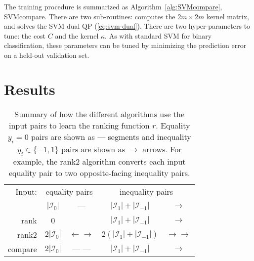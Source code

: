 \documentclass[twoside,11pt]{article}
\begin{document}
The training procedure is summarized as
Algorithm~\ref{alg:SVMcompare}, SVMcompare.
There are two sub-routines:  computes
the $2m\times 2m$ kernel matrix, and  solves the SVM
dual QP (\ref{eq:svm-dual}). There are two hyper-parameters to tune:
the cost $C$ and the kernel $\kappa$. As with standard SVM for binary
classification, these parameters can be tuned by minimizing the
prediction error on a held-out validation set.

\section{Results}
\label{sec:results}



\begin{table}[b!]
  \centering
  \begin{tabular}{r|cc|cc|}
Input:&    \multicolumn{2}{c|}{equality pairs}
&    \multicolumn{2}{c|}{inequality pairs}\\
    & $|\mathcal I_0|$ %
    & --- 
    & $|\mathcal I_1|+|\mathcal I_{-1}|$ %
    & $\rightarrow$
    \\
    \hline
    rank 
    & 0 
    & 
    & $|\mathcal I_1|+|\mathcal I_{-1}|$ 
    & $\rightarrow$ 
    \\
    \hline
    rank2 
    & $2|\mathcal I_0|$ 
    & $\leftarrow \rightarrow$
    & $2(|\mathcal I_1|+|\mathcal I_{-1}|)$ 
    & $\rightarrow \rightarrow$
    \\
    \hline
    compare 
    & $2|\mathcal I_0|$ 
    & --- --- 
    & $|\mathcal I_1|+|\mathcal I_{-1}|$ 
    & $\rightarrow$\\
    \hline
  \end{tabular}
  \caption{\label{tab:models}
    Summary of how the different algorithms 
    use the input pairs to learn the ranking 
    function $r$. Equality $y_i=0$ pairs are shown as ---  
    segments and inequality $y_i\in\{-1,1\}$ pairs 
    are shown as $\rightarrow$  arrows. For example, 
    the rank2 algorithm converts each input equality pair
    to two opposite-facing inequality pairs.}
\end{table}
\end{document}

